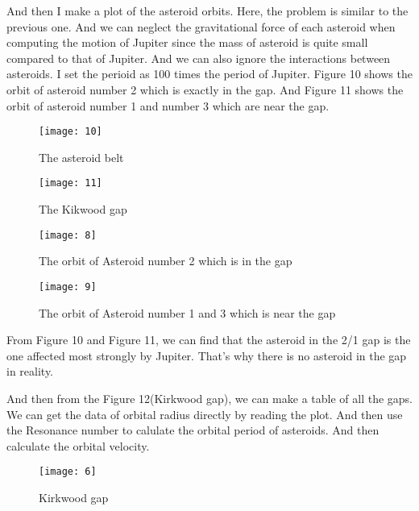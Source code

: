 \documentclass{article}
\begin{document}
And then I make a plot of the asteroid orbits. Here, the problem is similar to the previous one. And we can neglect the gravitational force of each asteroid when computing the motion of Jupiter since the mass of asteroid is quite small compared to that of Jupiter. And we can also ignore the interactions between asteroids. I set the perioid as 100 times the period of Jupiter. Figure 10 shows the orbit of asteroid number 2 which is exactly in the gap. And Figure 11 shows the orbit of asteroid number 1 and number 3 which are near the gap.

\begin{figure}
\centering
\texttt{[image: 10]} 
\caption{The asteroid belt}
\label{Fig:8} 
\end{figure}
\begin{figure}
\centering
\texttt{[image: 11]} 
\caption{The Kikwood gap}
\label{Fig:9} 
\end{figure}

\begin{figure}
\centering
\texttt{[image: 8]} 
\caption{The orbit of Asteroid number 2 which is in the gap}
\label{Fig:10} 
\end{figure}
\begin{figure}
\centering
\texttt{[image: 9]} 
\caption{The orbit of Asteroid number 1 and 3 which is near the gap}
\label{Fig:11} 
\end{figure}

From Figure 10 and Figure 11, we can find that the asteroid in the 2/1 gap is the one affected most strongly  by Jupiter. That's why there is no asteroid in the gap in reality.

And then from the Figure 12(Kirkwood gap), we can make a table of all the gaps. We can get the data of orbital radius directly by reading the plot. And then use the Resonance number to calulate the orbital period of asteroids. And then calculate the orbital velocity.
\begin{figure}
\centering
\texttt{[image: 6]} 
\caption{Kirkwood gap}
\label{Fig:12} 
\end{figure}
\end{document}

